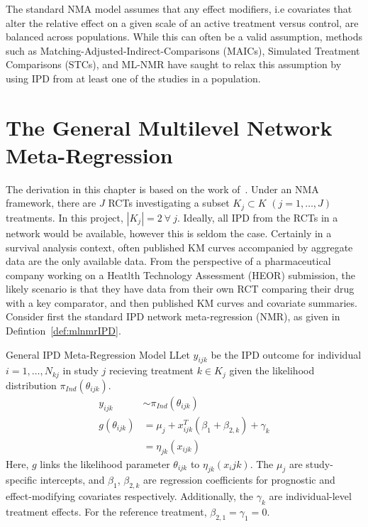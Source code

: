 The standard NMA model assumes that any effect modifiers, i.e covariates that alter the relative effect on a given scale of an active treatment versus control, are balanced across populations. While this can often be a valid assumption, methods such as Matching-Adjusted-Indirect-Comparisons (MAICs), Simulated Treatment Comparisons (STCs), and ML-NMR have saught to relax this assumption by using IPD from at least one of the studies in a population.

\section{The General Multilevel Network Meta-Regression}
The derivation in this chapter is based on the work of~\cite{phillippo2024}. Under an NMA framework, there are $J$ RCTs investigating a subset $K_j \subset K$ $(j = 1,\ldots,J)$ treatments. In this project, $|K_j| = 2 \ \forall \ j$. Ideally, all IPD from the RCTs in a network would be available, however this is seldom the case. Certainly in a survival analysis context, often published KM curves accompanied by aggregate data are the only available data. From the perspective of a pharmaceutical company working on a Heatlth Technology Assessment (HEOR) submission, the likely scenario is that they have data from their own RCT comparing their drug with a key comparator, and then published KM curves and covariate summaries. Consider first the standard IPD network meta-regression (NMR), as given in Defintion~\ref{def:mlnmrIPD}.

\begin{definition}{General IPD Meta-Regression Model}
    LLet $y_{ijk}$ be the IPD outcome for individual $i = 1, \ldots, N_{kj}$ in study $j$ recieving treatment $k \in K_j$ given the likelihood distribution $\pi_{Ind}(\theta_{ijk})$. 
    \begin{align*}
        y_{ijk} &\sim \pi_{Ind}(\theta_{ijk}) \\
        g(\theta_{ijk}) &= \mu_j + x^T_{ijk}(\beta_1 + \beta_{2,k}) + \gamma_k \\
                        &= \eta_{jk}(x_{ijk})
    \end{align*}
    Here, $g$ links the likelihood parameter $\theta_{ijk}$ to $\eta_{jk}(x_ijk)$. The $\mu_j$ are study-specific intercepts, and $\beta_1$, $\beta_{2,k}$ are regression coefficients for prognostic and effect-modifying covariates respectively. Additionally, the $\gamma_k$ are individual-level treatment effects. For the reference treatment, $\beta_{2,1} = \gamma_1 = 0$.
    \label{def:mlnmrIPD}
\end{definition}

